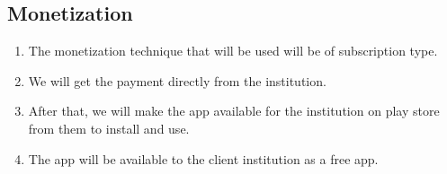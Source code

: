 \subsection{Monetization}
\begin{enumerate}
    \item The monetization technique that will be used will be of subscription type.
    \item We will get the payment directly from the institution.
    \item After that, we will make the app available for the institution on play store from them to install and use.
    \item The app will be available to the client institution as a free app.
\end{enumerate}
